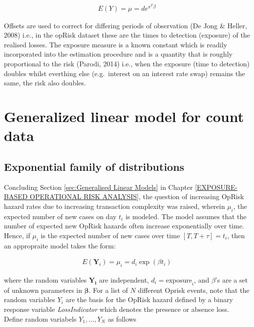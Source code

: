 \documentclass{DissertateUSU}
\begin{document}
\singlespacing

\begin{eqnarray}
E(Y) = \mu = d e^{x^T\beta}
\end{eqnarray} \doublespacing

Offsets are used to correct for differing periods of observation (De
Jong \& Heller, 2008) i.e., in the opRisk dataset these are the times to
detection (exposure) of the realised losses. The exposure measure is a
known constant which is readily incorporated into the estimation
procedure and is a quantity that is roughly proportional to the risk
(Parodi, 2014) i.e., when the exposure (time to detection) doubles
whilst everthing else (e.g.~interest on an interest rate swap) remains
the same, the risk also doubles.

\section{Generalized linear model for count data}
\label{sec:Generalized linear model for count data}

\subsection{Exponential family of distributions}

Concluding Section \ref{sec:Generalised Linear Models} in Chapter
\ref{EXPOSURE-BASED OPERATIONAL RISK ANALYSIS}, the question of
increasing OpRisk hazard rates due to increasing transaction complexity
was raised, wherein \(\mu_i\), the expected number of new cases on day
\(t_i\) is modeled. The model assumes that the number of expected new
OpRisk hazards often increase exponentially over time. Hence, if
\(\mu_i\) is the expected number of new cases over time
\([T,T+\tau] = t_i\), then an appropraite model takes the form:

\singlespacing

\begin{eqnarray}\label{expgrowth}
E(\mathbf{Y}_i) = \mu_i = d_i\exp{(\beta t_i)} 
\end{eqnarray} \doublespacing

where the random variables \(\mathbf{Y_i}\) are independent,
\(d_i = \mbox{exposure}_i\), and \(\beta\)'s are a set of unknown
parameters in \(\mathbf{\beta}\). For a list of \(N\) different Oprisk
events, note that the random variables \(Y_i\) are the basis for the
OpRisk hazard defined by a binary response variable \emph{LossIndicator}
which denotes the presence or absence loss. Define random variabels
\(Y_1,\ldots,Y_N\) as follows
\end{document}
